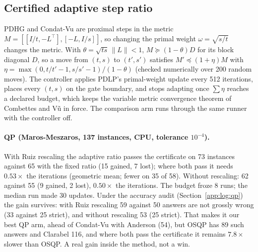 \subsection{Certified adaptive step ratio}
\label{app:log:adaptive}

PDHG and Condat-Vu are proximal steps in the metric
$M = [[I/t, -L^\top], [-L, I/s]]$, so changing the primal weight
$\omega = \sqrt{s/t}$ changes the metric. With $\theta = \sqrt{ts}\,\|L\| < 1$,
$M \succeq (1-\theta)D$ for its block diagonal $D$, so a move from $(t,s)$ to
$(t',s')$ satisfies $M' \preceq (1+\eta)M$ with
$\eta = \max(0, t/t'-1, s/s'-1)/(1-\theta)$ (checked numerically over 200
random moves). The controller applies PDLP's primal-weight update every 512
iterations, places every $(t,s)$ on the gate boundary, and stops adapting
once $\sum\eta$ reaches a declared budget, which keeps the variable metric
convergence theorem of Combettes and V\~u in force. The comparison arm runs
through the same runner with the controller off.

\paragraph{QP (Maros-Meszaros, 137 instances, CPU, tolerance $10^{-4}$).}
With Ruiz rescaling the adaptive ratio passes the certificate on 73
instances against 65 with the fixed ratio (15 gained, 7 lost); where both
pass it needs $0.53\times$ the iterations (geometric mean; fewer on 35 of 58).
Without rescaling: 62 against 55 (9 gained, 2 lost), $0.50\times$ the
iterations. The budget froze 8 runs; the median run made 30 updates. Under the
accuracy audit (Section~\ref{app:log:qp}) the gain survives: with Ruiz
rescaling 59 against 50 answers are not grossly wrong (33 against 25 strict),
and without rescaling 53 (25 strict). That makes it our best QP arm, ahead of
Condat-Vu with Anderson (54), but OSQP has 89 such answers and Clarabel 116,
and where both pass the certificate it remains $7.8\times$ slower than OSQP. A
real gain inside the method, not a win.

